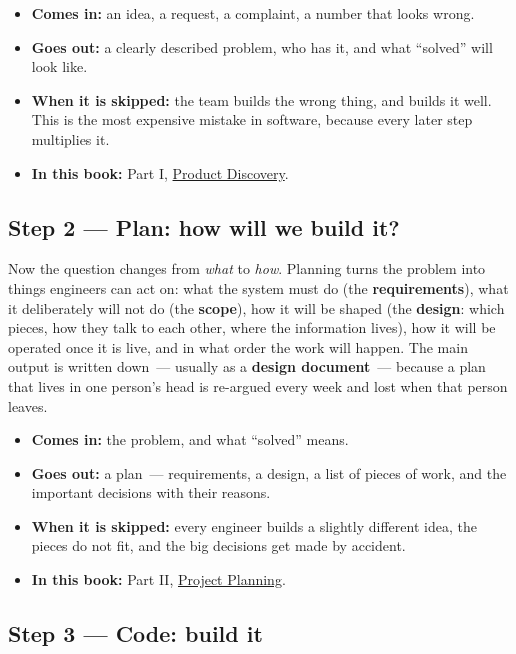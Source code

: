 \begin{itemize}
\tightlist
\item
  \textbf{Comes in:} an idea, a request, a complaint, a number that looks wrong.
\item
  \textbf{Goes out:} a clearly described problem, who has it, and what ``solved'' will look like.
\item
  \textbf{When it is skipped:} the team builds the wrong thing, and builds it well. This is the most expensive mistake in software, because every later step multiplies it.
\item
  \textbf{In this book:} Part I, \hyperref[ch:product-discovery]{Product Discovery}.
\end{itemize}

\subsection*{Step 2 --- Plan: how will we build it?}\label{how-software-gets-built:step-2--plan-how-will-we-build-it}

Now the question changes from \emph{what} to \emph{how}. Planning turns the problem into things engineers can act on: what the system must do (the \textbf{requirements}), what it deliberately will not do (the \textbf{scope}), how it will be shaped (the \textbf{design}: which pieces, how they talk to each other, where the information lives), how it will be operated once it is live, and in what order the work will happen. The main output is written down~--- usually as a \textbf{design document}~--- because a plan that lives in one person's head is re-argued every week and lost when that person leaves.

\begin{itemize}
\tightlist
\item
  \textbf{Comes in:} the problem, and what ``solved'' means.
\item
  \textbf{Goes out:} a plan~--- requirements, a design, a list of pieces of work, and the important decisions with their reasons.
\item
  \textbf{When it is skipped:} every engineer builds a slightly different idea, the pieces do not fit, and the big decisions get made by accident.
\item
  \textbf{In this book:} Part II, \hyperref[ch:project-planning-guide]{Project Planning}.
\end{itemize}

\subsection*{Step 3 --- Code: build it}\label{how-software-gets-built:step-3--code-build-it}

